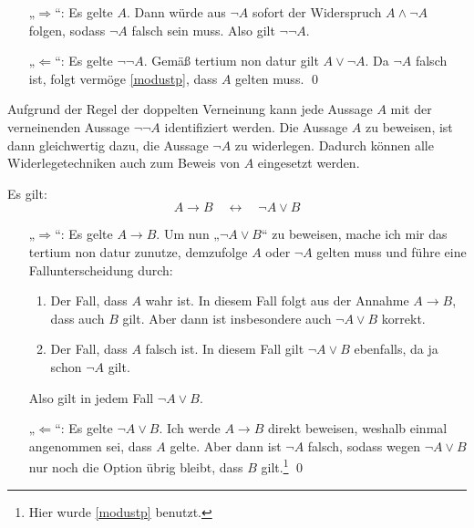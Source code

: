 \begin{bew}[(*)]
    \begin{itemize}
        \item[„$\Rightarrow$“:] Es gelte $A$. Dann würde aus $\neg A$ sofort der Widerspruch $A\land \neg A$ folgen, sodass $\neg A$ falsch sein muss. Also gilt $\neg\neg A$.
        \item[„$\Leftarrow$“:] Es gelte $\neg \neg A$. Gemäß tertium non datur gilt $A\lor \neg A$. Da $\neg A$ falsch ist, folgt vermöge \cref{modustp}, dass $A$ gelten muss. \qed
    \end{itemize}
\end{bew}


\begin{bem}
    Aufgrund der Regel der doppelten Verneinung kann jede Aussage $A$ mit der verneinenden Aussage $\neg\neg A$ identifiziert werden. Die Aussage $A$ zu beweisen, ist dann gleichwertig dazu, die Aussage $\neg A$ zu widerlegen. Dadurch können alle Widerlegetechniken auch zum Beweis von $A$ eingesetzt werden.
\end{bem}


\begin{satz} \label{implikationchar}
    Es gilt:
        \[ A\to B\quad \leftrightarrow\quad \neg A\lor B \]
\end{satz}


\begin{bew}[(*)]
    \begin{enumerate}
        \item[„$\Rightarrow$“:] Es gelte $A\to B$. Um nun „$\neg A\lor B$“ zu beweisen, mache ich mir das tertium non datur zunutze, demzufolge $A$ oder $\neg A$ gelten muss und führe eine Fallunterscheidung durch:
        \begin{enumerate}[(1)]
            \item Der Fall, dass $A$ wahr ist. In diesem Fall folgt aus der Annahme $A\to B$, dass auch $B$ gilt. Aber dann ist insbesondere auch $\neg A\lor B$ korrekt.
            \item Der Fall, dass $A$ falsch ist. In diesem Fall gilt $\neg A\lor B$ ebenfalls, da ja schon $\neg A$ gilt.
        \end{enumerate}
        Also gilt in jedem Fall $\neg A\lor B$.
        \item[„$\Leftarrow$“:] Es gelte $\neg A\lor B$. Ich werde $A\to B$ direkt beweisen, weshalb einmal angenommen sei, dass $A$ gelte. Aber dann ist $\neg A$ falsch, sodass wegen $\neg A\lor B$ nur noch die Option übrig bleibt, dass $B$ gilt.\footnote{Hier wurde \cref{modustp} benutzt.} \qed
    \end{enumerate}
\end{bew}


